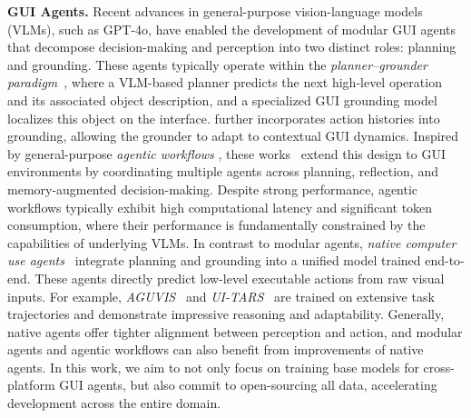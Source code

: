 \documentclass{article} %
\begin{document}
\textbf{GUI Agents.} Recent advances in general-purpose vision-language models (VLMs), such as GPT-4o, have enabled the development of modular GUI agents that decompose decision-making and perception into two distinct roles: planning and grounding. These agents typically operate within the \emph{planner–grounder paradigm}~\citep{cheng2024seeclick,hong2024cogagent, lu2024omniparserpurevisionbased,yu2025omniparser,wu2025gui,gou2024navigating,zhang2025guimid,wu2024osatlas,zhou2025guig1}, where a VLM-based planner predicts the next high-level operation and its associated object description, and a specialized GUI grounding model localizes this object on the interface. \cite{yang2024aria} further incorporates action histories into grounding, allowing the grounder to adapt to contextual GUI dynamics.
% 
Inspired by general-purpose \textit{agentic workflows} \citep{wu2023autogen,li2023camel,hong2023metagpt}, these works~\citep{wu2024copilot,liu2025pc,zhao2025cola,Agent-S2,chen2025map} extend this design to GUI environments by coordinating multiple agents across planning, reflection, and memory-augmented decision-making. 
% 
Despite strong performance, agentic workflows typically exhibit high computational latency and significant token consumption, where their performance is fundamentally constrained by the capabilities of underlying VLMs.
% 
In contrast to modular agents, \textit{native computer use agents}~\citep{xu2024aguvis,wu2024osatlas,sun2024osgenesis,qin2025uitars,luo2025gui,liu2025infigui,sun2025scienceboard} integrate planning and grounding into a unified model trained end-to-end. These agents directly predict low-level executable actions from raw visual inputs. For example, \textit{AGUVIS}~\citep{xu2024aguvis} and \textit{UI-TARS}~\citep{qin2025uitars} are trained on extensive task trajectories and demonstrate impressive reasoning and adaptability. 
% 
Generally, native agents offer tighter alignment between perception and action, and modular agents and agentic workflows can also benefit from improvements of native agents. 
% 
In this work, we aim to not only focus on training base models for cross-platform GUI agents, but also commit to open-sourcing all data, accelerating development across the entire domain.
\end{document}
